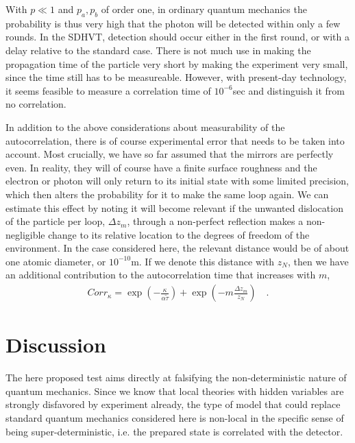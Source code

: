 \documentclass[12pt]{article}                    %
\newcommand{\beqn}{\begin{eqnarray}}
\newcommand{\eeqn}{\end{eqnarray}}
\begin{document}
With $p\ll 1$ and $p_a, p_b$ of order one, in ordinary quantum mechanics the probability
is thus very high that the photon will be detected within only a few rounds. In 
the {\sc SDHVT}, detection should occur either in the first round,
or with a delay relative to the standard case. There is not much
use in making the propagation time of the particle very short by
making the experiment very small, since the time still has to be
measureable. However, with present-day technology, it seems feasible
to measure a correlation time of $10^{-6}$sec and distinguish it
from no correlation.

In addition to the above considerations about measurability of the autocorrelation,
there is of course experimental error that needs to be taken into account. Most
crucially, we have so far assumed that the mirrors are perfectly even. In reality, they
will of course have a finite surface roughness and the electron or photon will only return
to its initial state with some limited precision, which then alters the 
probability for it to make the same loop again. We can estimate this effect by
noting it will become relevant if the unwanted dislocation of the particle per loop, 
$\Delta z_m$,  
through a non-perfect reflection makes a non-negligible change to its relative 
location to the degrees of freedom of the environment. In the case considered
here, the relevant distance would be of about one atomic diameter, or $10^{-10}$m.
If we denote this distance with $z_N$, then we have an additional contribution
to the autocorrelation time that increases with $m$,
\beqn
Corr_{\kappa} = \exp \left( - \frac{\kappa}{\alpha \tilde \tau} \right) + \exp \left(- m \frac{\Delta z_m}{z_N} \right) \quad.
\eeqn

\section{Discussion}

The here proposed test aims directly at falsifying the non-deterministic nature
of quantum mechanics. Since we know that local theories with hidden variables 
are strongly disfavored by experiment already, the type of model that could replace
standard quantum mechanics considered here is non-local in
the specific sense of being super-deterministic, i.e. the prepared state
is correlated with the detector. 
\end{document}
